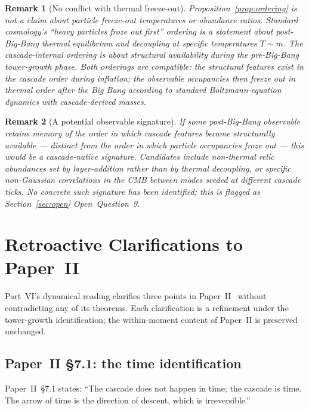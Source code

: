 \documentclass[12pt,a4paper]{article}
\newtheorem*{remark}{Remark}
\begin{document}
\begin{remark}[No conflict with thermal freeze-out]
Proposition~\ref{prop:ordering} is not a claim about particle freeze-out
temperatures or abundance ratios. Standard cosmology's ``heavy particles
froze out first'' ordering is a statement about post-Big-Bang thermal
equilibrium and decoupling at specific temperatures $T \sim m$. The
cascade-internal ordering is about \emph{structural availability} during the
pre-Big-Bang tower-growth phase. Both orderings are compatible: the structural
features exist in the cascade order during inflation; the observable
occupancies then freeze out in thermal order after the Big Bang according to
standard Boltzmann-equation dynamics with cascade-derived masses.
\end{remark}

\begin{remark}[A potential observable signature]
If some post-Big-Bang observable retains memory of the \emph{order} in which
cascade features became structurally available --- distinct from the order in
which particle occupancies froze out --- this would be a cascade-native
signature. Candidates include non-thermal relic abundances set by
layer-addition rather than by thermal decoupling, or specific non-Gaussian
correlations in the CMB between modes seeded at different cascade ticks. No
concrete such signature has been identified; this is flagged as
Section~\ref{sec:open} Open~Question~9.
\end{remark}

\section{Retroactive Clarifications to Paper~II}
\label{sec:paper2-amendments}

Part~VI's dynamical reading clarifies three points in Paper~II~\cite{part2}
without contradicting any of its theorems. Each clarification is a refinement
under the tower-growth identification; the within-moment content of Paper~II
is preserved unchanged.

\subsection{Paper~II \S7.1: the time identification}

Paper~II~\S7.1 states: ``The cascade does not happen in time; the cascade is
time. The arrow of time is the direction of descent, which is irreversible.''
\end{document}
